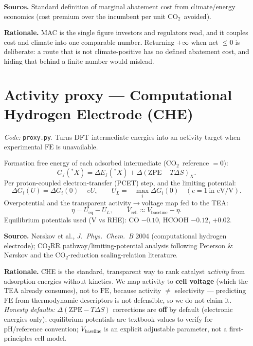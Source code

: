 \documentclass[11pt,a4paper]{article}
\newcommand{\co}{\ensuremath{\mathrm{CO_2}}}
\newcommand{\FE}{\mathrm{FE}}
\begin{document}
\textbf{Source.} Standard definition of marginal abatement cost from
climate/energy economics (cost premium over the incumbent per unit \co\ avoided).

\textbf{Rationale.} MAC is the single figure investors and regulators read, and it
couples cost and climate into one comparable number. Returning $+\infty$ when
net $\le 0$ is deliberate: a route that is not climate-positive has no defined
abatement cost, and hiding that behind a finite number would mislead.

\section{Activity proxy --- Computational Hydrogen Electrode (CHE)}
\emph{Code: }\texttt{proxy.py}. Turns DFT intermediate energies into an activity
target when experimental $\FE$ is unavailable.

Formation free energy of each adsorbed intermediate (\co\ reference $=0$):
\begin{equation}
G_f({}^{*}X) = \Delta E_f({}^{*}X) + \Delta(\mathrm{ZPE}-T\Delta S)_X .
\end{equation}
Per proton-coupled electron-transfer (PCET) step, and the limiting potential:
\begin{equation}
\Delta G_i(U) = \Delta G_i(0) - eU, \qquad
U_L = -\max_i \Delta G_i(0)\quad (e = 1\ \text{in eV/V}).
\end{equation}
Overpotential and the transparent activity$\to$voltage map fed to the TEA:
\begin{equation}
\eta = U_\mathrm{eq} - U_L, \qquad
V_\mathrm{cell} \approx V_\mathrm{baseline} + \eta .
\end{equation}
Equilibrium potentials used (V vs RHE): CO $-0.10$, HCOOH $-0.12$,
 $+0.02$.

\textbf{Source.} N{\o}rskov et al., \emph{J.\ Phys.\ Chem.\ B} 2004 (computational
hydrogen electrode); \co RR pathway/limiting-potential analysis following
Peterson \& N{\o}rskov and the \co-reduction scaling-relation literature.

\textbf{Rationale.} CHE is the standard, transparent way to rank catalyst
\emph{activity} from adsorption energies without kinetics. We map activity to
\textbf{cell voltage} (which the TEA already consumes), not to $\FE$, because
activity $\neq$ selectivity --- predicting $\FE$ from thermodynamic descriptors is
not defensible, so we do not claim it. \emph{Honesty defaults:}
$\Delta(\mathrm{ZPE}-T\Delta S)$ corrections are \textbf{off} by default
(electronic energies only); equilibrium potentials are textbook values to verify
for pH/reference convention; $V_\mathrm{baseline}$ is an explicit adjustable
parameter, not a first-principles cell model.
\end{document}
